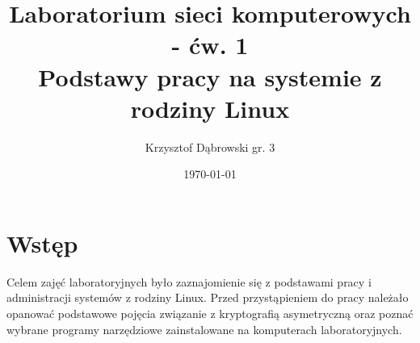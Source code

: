 \documentclass{article}
\title{Laboratorium sieci komputerowych - ćw. 1 \\ Podstawy pracy na systemie z rodziny Linux}
\author{Krzysztof Dąbrowski gr. 3}
\date{\today}
\begin{document}
\maketitle{}
\tableofcontents{}
\newpage

\section{Wstęp}
Celem zajęć laboratoryjnych było zaznajomienie się z podstawami pracy i administracji systemów z rodziny Linux. Przed przystąpieniem do pracy należało opanować podstawowe pojęcia związanie z kryptografią asymetryczną oraz poznać wybrane programy narzędziowe zainstalowane na komputerach laboratoryjnych.
\end{document}
